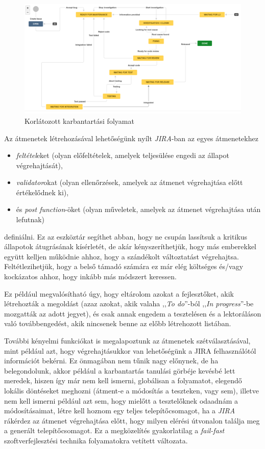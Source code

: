 \begin{figure}[h]
    \includegraphics[width=\textwidth, keepaspectratio]{figures/newmt.png}
    \centering
    \caption{Korlátozott karbantartási folyamat}
    \label{fig:newmt}
\end{figure}

\FloatBarrier

Az átmenetek létrehozásával lehetőségünk nyílt \emph{JIRA}-ban az egyes átmenetekhez
\begin{itemize}
    \item \emph{feltétel}eket (olyan előfeltételek, amelyek teljesülése engedi az állapot
        végrehajtását),
    \item \emph{validator}okat (olyan ellenőrzések, amelyek az átmenet végrehajtása előtt
        értékelődnek ki),
    \item és \emph{post function}-öket (olyan műveletek, amelyek az átmenet végrehajtása után
        lefutnak)
\end{itemize}
definiálni. Ez az eszköztár segíthet abban, hogy ne csupán lassítsuk a kritikus állapotok
átugrásának kísérletét, de akár kényszeríthetjük, hogy más emberekkel együtt kelljen működnie ahhoz,
hogy a szándékolt változtatást végrehajtsa. Feltétlezihetjük, hogy a belső támadó számára ez már
elég költséges és/vagy kockázatos ahhoz, hogy inkább más módszert keressen.

Ez például megvalósítható úgy, hogy eltárolom azokat a fejlesztőket, akik létrehozták a megoldást
(azaz azokat, akik valaha ,,\emph{To do}''-ból ,,\emph{In progress}''-be mozgatták az adott jegyet),
és csak annak engedem a tesztelésen és a lektoráláson való továbbengedést, akik nincsenek benne az
előbb létrehozott listában.

További kényelmi funkciókat is megalapoztunk az átmenetek szétválasztásával, mint például azt, hogy
végrehajtásukkor van lehetőségünk a JIRA felhasználótól információt bekérni.  Ez önmagában nem tűnik
nagy előnynek, de ha belegondolunk, akkor például a karbantartás tanulási görbéje kevésbé lett
meredek, hiszen így már nem kell ismerni, globálisan a folyamatot, elegendő lokális döntéseket
meghozni (átment-e a módosítás a teszteken, vagy sem), illetve nem kell ismerni például azt sem,
hogy mielőtt a tesztelőknek odaadnám a módosításaimat, létre kell hoznom egy teljes
telepítőcsomagot, ha a \emph{JIRA} rákérdez az átmenet végrehajtása előtt, hogy milyen elérési
útvonalon találja meg a generált telepítőcsomagot. Ez a megközelítés gyakorlatilag
a \emph{fail-fast} \cite{FailFast} szoftverfejlesztési technika folyamatokra vetített változata.

